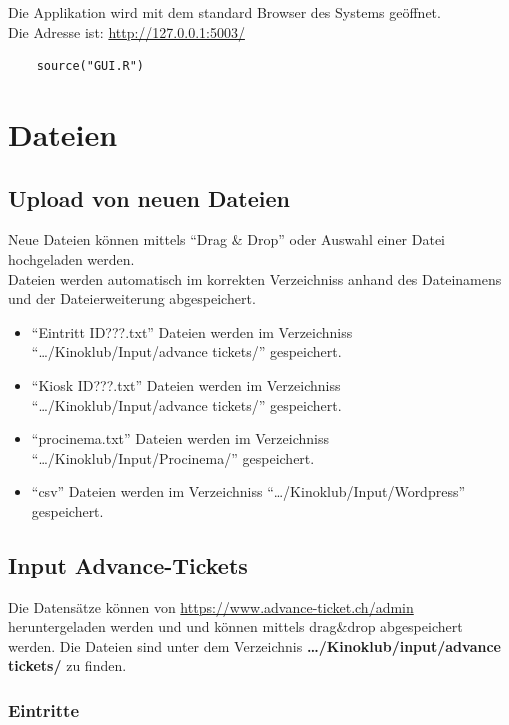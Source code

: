 \documentclass[
]{article}
\providecommand{\tightlist}{%
  \setlength{\itemsep}{0pt}\setlength{\parskip}{0pt}}
\begin{document}
Die Applikation wird mit dem standard Browser des Systems geöffnet.\\
Die Adresse ist: \url{http://127.0.0.1:5003/}

\begin{verbatim}
    source("GUI.R")
\end{verbatim}

\section{Dateien}\label{dateien}

\subsection{Upload von neuen Dateien}\label{upload-von-neuen-dateien}

Neue Dateien können mittels ``Drag \& Drop'' oder Auswahl einer Datei
hochgeladen werden.\\
Dateien werden automatisch im korrekten Verzeichniss anhand des
Dateinamens und der Dateierweiterung abgespeichert.

\begin{itemize}
\tightlist
\item
  ``Eintritt ID???.txt'' Dateien werden im Verzeichniss
  ``\ldots/Kinoklub/Input/advance tickets/'' gespeichert.
\item
  ``Kiosk ID???.txt'' Dateien werden im Verzeichniss
  ``\ldots/Kinoklub/Input/advance tickets/'' gespeichert.
\item
  ``procinema.txt'' Dateien werden im Verzeichniss
  ``\ldots/Kinoklub/Input/Procinema/'' gespeichert.
\item
  ``csv'' Dateien werden im Verzeichniss
  ``\ldots/Kinoklub/Input/Wordpress'' gespeichert.
\end{itemize}

\subsection{Input Advance-Tickets}\label{input-advance-tickets}

Die Datensätze können von \url{https://www.advance-ticket.ch/admin}
heruntergeladen werden und und können mittels drag\&drop abgespeichert
werden. Die Dateien sind unter dem Verzeichnis
\textbf{\ldots/Kinoklub/input/advance tickets/} zu finden.

\subsubsection{Eintritte}\label{eintritte}
\end{document}
